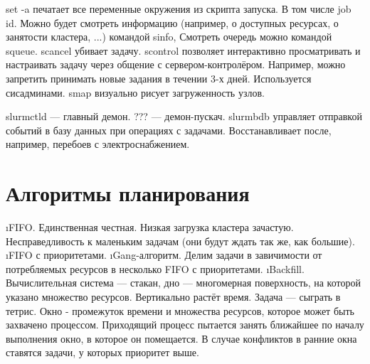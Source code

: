  set -a печатает все переменные окружения из скрипта запуска. В том числе job id. Можно будет смотреть информацию (например, о доступных ресурсах, о занятости кластера, ...) командой sinfo, 
 Смотреть очередь можно командой squeue.
 scancel убивает задачу.
 scontrol позволяет интерактивно просматривать и настраивать задачу через общение с сервером-контролёром. Например, можно запретить принимать новые задания в течении 3-х дней. Используется сисадминами.
 smap визуально рисует загруженность узлов.
 
 slurmctld --- главный демон.
 ??? --- демон-пускач.
 slurmbdb управляет отправкой событий в базу данных при операциях с задачами. Восстанавливает после, например, перебоев с электроснабжением.
 
 \section{Алгоритмы планирования}
 \begin{enumerate}
 \i FIFO. Единственная честная. Низкая загрузка кластера зачастую. Несправедливость к маленьким задачам (они будут ждать так же, как большие).
 \i FIFO с приоритетами.
 \i Gang-алгоритм. Делим задачи в завичимости от потребляемых ресурсов в несколько FIFO с приоритетами.
 \i Backfill. Вычислительная система --- стакан, дно --- многомерная поверхность, на которой указано множество ресурсов. Вертикально растёт время. Задача --- сыграть в тетрис.
  Окно - промежуток времени и множества ресурсов, которое может быть захвачено процессом. Приходящий процесс пытается занять ближайшее по началу выполнения окно, в которое он помещается. В случае конфликтов в ранние окна ставятся задачи, у которых приоритет выше.
 \end{enumerate}

